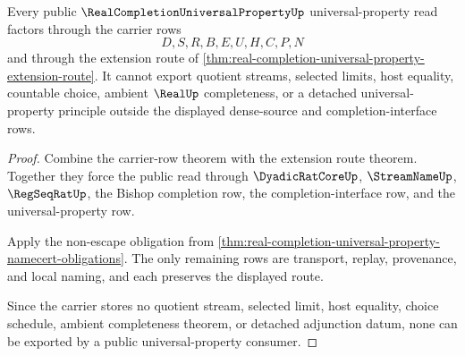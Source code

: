 \begin{theorem}
\label{thm:real-completion-universal-property-nonescape}
Every public $\RealCompletionUniversalPropertyUp$ universal-property read factors through the carrier rows
$$
D,S,R,B,E,U,H,C,P,N
$$
and through the extension route of \autoref{thm:real-completion-universal-property-extension-route}. It cannot export quotient streams, selected limits, host equality, countable choice, ambient $\RealUp$ completeness, or a detached universal-property principle outside the displayed dense-source and completion-interface rows.
\end{theorem}
\begin{proof}
Combine the carrier-row theorem with the extension route theorem. Together they force the public read through $\DyadicRatCoreUp$, $\StreamNameUp$, $\RegSeqRatUp$, the Bishop completion row, the completion-interface row, and the universal-property row.

Apply the non-escape obligation from \autoref{thm:real-completion-universal-property-namecert-obligations}. The only remaining rows are transport, replay, provenance, and local naming, and each preserves the displayed route.

Since the carrier stores no quotient stream, selected limit, host equality, choice schedule, ambient completeness theorem, or detached adjunction datum, none can be exported by a public universal-property consumer.
\end{proof}

